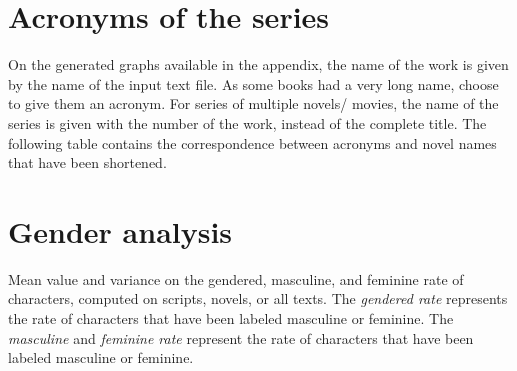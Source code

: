 \documentclass[a4paper, 12pt]{report}
\begin{document}
\listoffigures
\listoftables



\begin{appendices}

\chapter{Acronyms of the series}
\label{acronyms}
On the generated graphs available in the appendix, the name of the work is given by the name of the input text file. As some books had a very long name, \cite{original} choose to give them an acronym. For series of multiple novels/ movies, the name of the series is given with the number of the work, instead of the complete title. The following table contains the correspondence between acronyms and novel names that have been shortened. \\


\begin{table}
\center
{}
\caption{Acronyms of novels series.}
\label{acronyms_table}
\end{table}







\chapter{Gender analysis}
\label{gender_table}
\begin{table}[]
\caption{Mean value and variance on the gendered, masculine, and feminine rate of characters, computed on scripts, novels, or all texts. The \textit{gendered rate} represents the rate of characters that have been labeled masculine or feminine. The \textit{masculine} and \textit{feminine rate} represent the rate of characters that have been labeled masculine or feminine. }
\label{gender_all}
\end{table}


\end{appendices}
\end{document}
